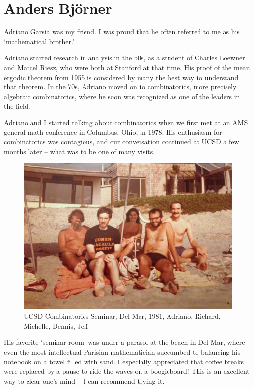 \documentclass{notices}
\begin{document}
\section*{Anders Bj\"orner}

Adriano Garsia was my friend. I was proud that he often referred to me as his `mathematical brother.' 
 
Adriano started research in analysis in the 50s, as a student of Charles Loewner and Marcel Riesz, who were both at Stanford at that time. His proof of the mean ergodic theorem from 1955 is considered by many the best way to understand that theorem. In the 70s, Adriano moved on to combinatorics, more precisely algebraic combinatorics, where he soon was recognized as one of the leaders in the field.
 
Adriano and I started talking about combinatorics when we first met at an AMS general math conference in Columbus, Ohio, in 1978. 
His enthusiasm for combinatorics was contagious, and our conversation continued at UCSD a few months later – what was to be one of many visits. 
\begin{figure}
    \includegraphics[width=0.95\linewidth]{Michelle_Wachs/IMG_2458.jpg} 
  {\footnotesize UCSD Combinatorics Seminar, Del Mar, 1981, Adriano, Richard, Michelle, Dennis, Jeff}
\end{figure}
His favorite `seminar room' was under a parasol at the beach in Del Mar, where even the most intellectual Parisian mathematician succumbed to balancing his notebook on a towel filled with sand. I especially appreciated that coffee breaks were replaced by a pause to ride the waves on a boogieboard! This is an excellent way to clear one's mind – I can recommend trying it.
 
\end{document}
